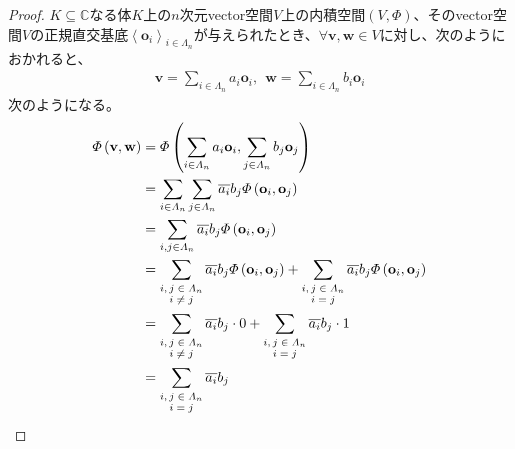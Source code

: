 \documentclass[dvipdfmx]{jsarticle}
\begin{document}
\begin{proof}
$K \subseteq \mathbb{C}$なる体$K$上の$n$次元vector空間$V$上の内積空間$(V,\varPhi)$、そのvector空間$V$の正規直交基底$\left\langle \mathbf{o}_{i} \right\rangle_{i \in \varLambda_{n}}$が与えられたとき、$\forall\mathbf{v},\mathbf{w} \in V$に対し、次のようにおかれると、
\begin{align*}
\mathbf{v} = \sum_{i \in \varLambda_{n}} {a_{i}\mathbf{o}_{i}},\ \ \mathbf{w} = \sum_{i \in \varLambda_{n}} {b_{i}\mathbf{o}_{i}}
\end{align*}
次のようになる。
\begin{align*}
\varPhi\left( \mathbf{v},\mathbf{w} \right) &= \varPhi\left( \sum_{i \in \varLambda_{n}} {a_{i}\mathbf{o}_{i}},\sum_{j \in \varLambda_{n}} {b_{j}\mathbf{o}_{j}} \right)\\
&= \sum_{i \in \varLambda_{n}} {\sum_{j \in \varLambda_{n}} {\overline{a_{i}}b_{j}\varPhi\left( \mathbf{o}_{i},\mathbf{o}_{j} \right)}}\\
&= \sum_{i,j \in \varLambda_{n}} {\overline{a_{i}}b_{j}\varPhi\left( \mathbf{o}_{i},\mathbf{o}_{j} \right)}\\
&= \sum_{\scriptsize \begin{matrix} i,j \in \varLambda_{n}\\i \neq j\\\end{matrix}} {\overline{a_{i}}b_{j}\varPhi\left( \mathbf{o}_{i},\mathbf{o}_{j} \right)} + \sum_{\scriptsize \begin{matrix} i,j \in \varLambda_{n}\\i = j\\\end{matrix}} {\overline{a_{i}}b_{j}\varPhi\left( \mathbf{o}_{i},\mathbf{o}_{j} \right)}\\
&= \sum_{\scriptsize \begin{matrix} i,j \in \varLambda_{n}\\i \neq j\\\end{matrix}} {\overline{a_{i}}b_{j} \cdot 0} + \sum_{\scriptsize \begin{matrix} i,j \in \varLambda_{n}\\i = j\\\end{matrix}} {\overline{a_{i}}b_{j} \cdot 1}\\
&= \sum_{\scriptsize \begin{matrix} i,j \in \varLambda_{n}\\i = j\\\end{matrix}} {\overline{a_{i}}b_{j}}\\

\end{align*}
\end{proof}
\end{document}
